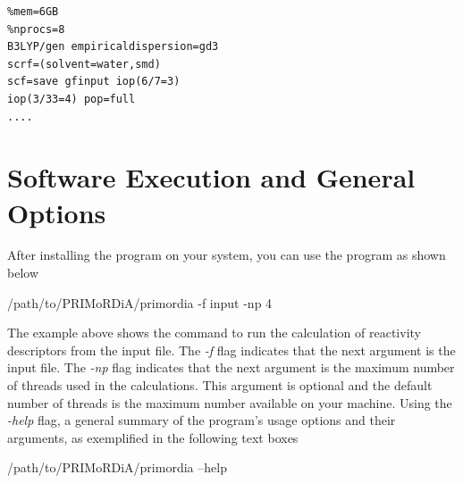 \documentclass[a4paper,11pt]{refart}
\begin{document}
\newpage
\begin{minipage}{\textwidth}
\begin{lstlisting}[caption={Input Example for Gaussian},label={ls.gauss}]
%chk=Fe_DFO_s2_nuevo.chk
%mem=6GB
%nprocs=8
B3LYP/gen empiricaldispersion=gd3 
scrf=(solvent=water,smd)
scf=save gfinput iop(6/7=3)
iop(3/33=4) pop=full
....
\end{lstlisting}
\end{minipage}

\newpage

\section{Software Execution and General Options}

After installing the program on your system, you can use the program as shown below

\hspace*{-\leftmarginwidth}
\begin{minipage}{\fullwidth}
\begin{commandshell}/path/to/PRIMoRDiA/primordia -f input -np 4\end{commandshell}
\end{minipage}

The example above shows the command to run the calculation of reactivity descriptors from the input file. The \emph{-f} flag indicates that the next argument is the input file. The \emph{-np} flag indicates that the next argument is the maximum number of threads used in the calculations. This argument is optional and the default number of threads is the maximum number available on your machine. Using the \emph{-help} flag, a general summary of the program's usage options and their arguments, as exemplified in the following text boxes


\hspace*{-\leftmarginwidth}
\begin{minipage}{\fullwidth}
	\begin{commandshell}/path/to/PRIMoRDiA/primordia --help\end{commandshell}
\end{minipage}
\end{document}
